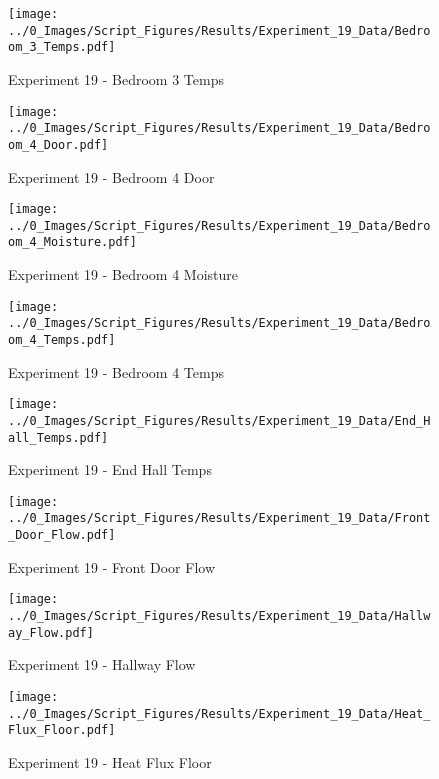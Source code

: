 	\clearpage

	\begin{figure}[H]
		\centering
		\texttt{[image: ../0\_Images/Script\_Figures/Results/Experiment\_19\_Data/Bedroom\_3\_Temps.pdf]}
		\caption[]{Experiment 19 - Bedroom 3 Temps}
	\end{figure}
 

	\begin{figure}[H]
		\centering
		\texttt{[image: ../0\_Images/Script\_Figures/Results/Experiment\_19\_Data/Bedroom\_4\_Door.pdf]}
		\caption[]{Experiment 19 - Bedroom 4 Door}
	\end{figure}
 
	\clearpage

	\begin{figure}[H]
		\centering
		\texttt{[image: ../0\_Images/Script\_Figures/Results/Experiment\_19\_Data/Bedroom\_4\_Moisture.pdf]}
		\caption[]{Experiment 19 - Bedroom 4 Moisture}
	\end{figure}
 

	\begin{figure}[H]
		\centering
		\texttt{[image: ../0\_Images/Script\_Figures/Results/Experiment\_19\_Data/Bedroom\_4\_Temps.pdf]}
		\caption[]{Experiment 19 - Bedroom 4 Temps}
	\end{figure}
 
	\clearpage

	\begin{figure}[H]
		\centering
		\texttt{[image: ../0\_Images/Script\_Figures/Results/Experiment\_19\_Data/End\_Hall\_Temps.pdf]}
		\caption[]{Experiment 19 - End Hall Temps}
	\end{figure}
 

	\begin{figure}[H]
		\centering
		\texttt{[image: ../0\_Images/Script\_Figures/Results/Experiment\_19\_Data/Front\_Door\_Flow.pdf]}
		\caption[]{Experiment 19 - Front Door Flow}
	\end{figure}
 
	\clearpage

	\begin{figure}[H]
		\centering
		\texttt{[image: ../0\_Images/Script\_Figures/Results/Experiment\_19\_Data/Hallway\_Flow.pdf]}
		\caption[]{Experiment 19 - Hallway Flow}
	\end{figure}
 

	\begin{figure}[H]
		\centering
		\texttt{[image: ../0\_Images/Script\_Figures/Results/Experiment\_19\_Data/Heat\_Flux\_Floor.pdf]}
		\caption[]{Experiment 19 - Heat Flux Floor}
	\end{figure}
 
